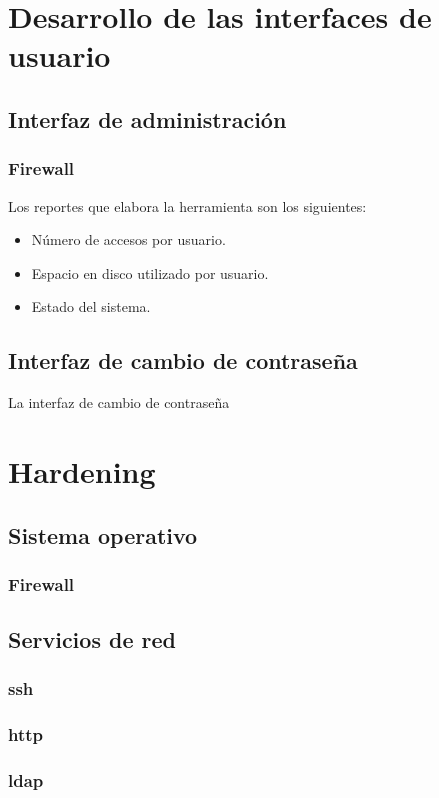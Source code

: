     \section {Desarrollo de las interfaces de usuario}


      \subsection {Interfaz de administraci\'{o}n}

        \subsubsection {Firewall}

Los reportes que elabora la herramienta son los siguientes:

\begin{itemize}
  \item N\'{u}mero de accesos por usuario.
  \item Espacio en disco utilizado por usuario.
  \item Estado del sistema.
\end{itemize}

      \subsection {Interfaz de cambio de contrase\~{n}a}

La interfaz de cambio de contrase\~{n}a

    \section {Hardening}

      \subsection {Sistema operativo}

        \subsubsection {Firewall}

      \subsection {Servicios de red}

        \subsubsection {ssh}

        \subsubsection {http}

        \subsubsection {ldap}

